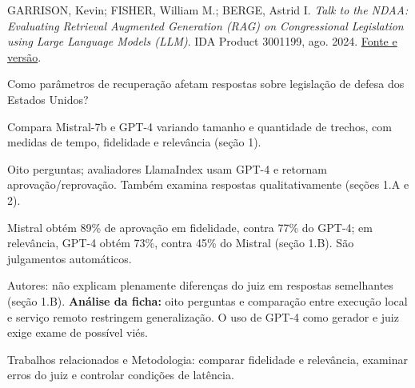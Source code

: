 {\small GARRISON, Kevin; FISHER, William M.; BERGE, Astrid I. \textit{Talk to the NDAA: Evaluating Retrieval Augmented Generation (RAG) on Congressional Legislation using Large Language Models (LLM)}. IDA Product 3001199, ago. 2024. \href{https://www.ida.org/-/media/feature/publications/t/ta/talk-to-the-ndaa/3001199.ashx}{Fonte e versão}.\par}

Como parâmetros de recuperação afetam respostas sobre legislação de defesa dos Estados Unidos?

Compara Mistral-7b e GPT-4 variando tamanho e quantidade de trechos, com medidas de tempo, fidelidade e relevância (seção 1).

Oito perguntas; avaliadores LlamaIndex usam GPT-4 e retornam aprovação/reprovação. Também examina respostas qualitativamente (seções 1.A e 2).

Mistral obtém 89\% de aprovação em fidelidade, contra 77\% do GPT-4; em relevância, GPT-4 obtém 73\%, contra 45\% do Mistral (seção 1.B). São julgamentos automáticos.

\begin{itemize}
\end{itemize}

Autores: não explicam plenamente diferenças do juiz em respostas semelhantes (seção 1.B). \textbf{Análise da ficha:} oito perguntas e comparação entre execução local e serviço remoto restringem generalização. O uso de GPT-4 como gerador e juiz exige exame de possível viés.

Trabalhos relacionados e Metodologia: comparar fidelidade e relevância, examinar erros do juiz e controlar condições de latência.

